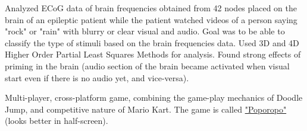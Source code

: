 \documentclass[letterpaper]{deedy-resume-openfont} %
\begin{document}
\begin{minipage}[t]{0.7\textwidth}

Analyzed ECoG data of brain frequencies obtained from 42 nodes placed on the brain of an epileptic patient while the patient watched videos of a person saying "rock" or "rain" with blurry or clear visual and audio. Goal was to be able to classify the type of stimuli based on the brain frequencies data. Used 3D and 4D Higher Order Partial Least Squares Methods for analysis. Found strong effects of priming in the brain (audio section of the brain became activated when visual start even if there is no audio yet, and vice-versa).

\sectionsep %



Multi-player, cross-platform game, combining the game-play mechanics of Doodle Jump, and competitive nature of Mario Kart. The game is called \href{http://poporopo.nimbusmog.com}{"Poporopo"} (looks better in half-screen).

\sectionsep %

\end{minipage} %

\end{document}
